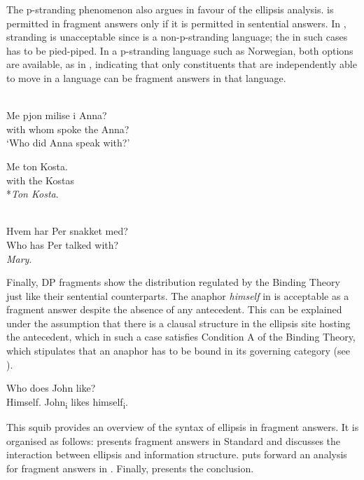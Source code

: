 \documentclass[output=paper]{LSP/langsci}
\begin{document}
{The p-stranding phenomenon also argues in favour of the ellipsis analysis.  is permitted in fragment answers only if it is permitted in sentential answers. In ,  stranding is unacceptable since  is a non-p-stranding language; the  in such cases has to be pied-piped. In a p-stranding language such as} {Norwegian}{, both options are available, as in , indicating that only constituents that are independently able to move in a language can be fragment answers in that language.}

\newpage 
\ea%
 \label{ex:algryani:7}
	  \citep[685--686]{Merchant2004}\\
\ea \label{ex:algryani:7a}
\gll  Me pjon milise i Anna? \\
      with whom spoke the Anna?\\
\glt `Who did Anna speak with?'

\ex \label{ex:algryani:7b}
\gll  Me ton Kosta.\\
with the Kostas\\

\ex \label{ex:algryani:7c} 
*\textit{Ton Kosta}.\\
	 
\z
\z


\ea\label{ex:algryani:8}
 {\citep[685--686]{Merchant2004}}\\
\ea \label{ex:algryani:8a}
\gll Hvem har Per snakket med? \\
 Who has Per talked with?\\
\ex \label{ex:algryani:8b} \textit{Mary}.
\z
\z


Finally, DP fragments show the distribution regulated by the Binding Theory just like their sentential counterparts. The anaphor \textit{himself} in  is acceptable as a fragment answer despite the absence of any antecedent. This can be explained under the assumption that there is a clausal structure in the ellipsis site hosting the antecedent, which in such a case satisfies Condition A of the Binding Theory, which stipulates that an anaphor has to be bound in its governing category (see \citealt{Merchant2004,Merchant2006}).


\ea%
 \label{ex:algryani:9}
	 Who does John like?\\
	\ea \label{ex:algryani:9a} Himself.
	\ex \label{ex:algryani:9b} John\textsubscript{i} likes himself\textsubscript{i}.
\z\z

This squib provides an overview of the syntax of ellipsis in  fragment answers. It is organised as follows:  presents fragment answers in Standard  and discusses the interaction between ellipsis and information structure.  puts forward an analysis for fragment answers in . Finally,  presents the conclusion.
\end{document}
